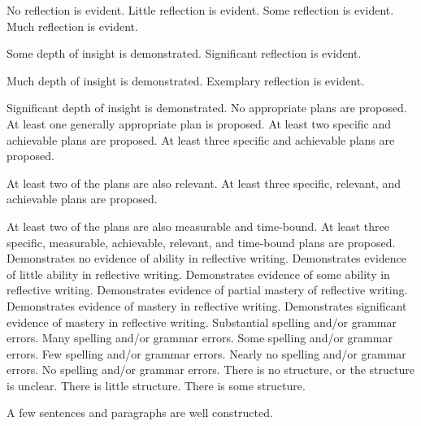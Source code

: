 \documentclass{../fal_assignment}
\begin{document}
\begin{markingrubric}
        \grade\fail 	No reflection is evident.
        \grade 		Little reflection is evident.
        \grade 		Some reflection is evident.
        \grade 		Much reflection is evident.
        \par 		Some depth of insight is demonstrated.
        \grade 		Significant reflection is evident.
        \par 		Much depth of insight is demonstrated.
        \grade 		Exemplary reflection is evident.
        \par 		Significant depth of insight is demonstrated.
%
        \grade\fail 	No appropriate plans are proposed.
        \grade 		At least one generally appropriate plan is proposed.
        \grade 		At least two specific and achievable plans are proposed. 
        \grade 		At least three specific and achievable plans are proposed. 
        \par 		At least two of the plans are also relevant.
        \grade 		At least three specific, relevant, and achievable plans are proposed. 
        \par 		At least two of the plans are also measurable and time-bound.
        \grade 		At least three specific, measurable, achievable, relevant, and time-bound plans are proposed. 
%
        \grade\fail 	Demonstrates no evidence of ability in reflective writing.
        \grade 		Demonstrates evidence of little ability in reflective writing.
        \grade 		Demonstrates evidence of some ability in reflective writing.  
        \grade 		Demonstrates evidence of partial mastery of reflective writing.
        \grade 		Demonstrates evidence of mastery in reflective writing.
        \grade 		Demonstrates significant evidence of mastery in reflective writing.
%
        \grade\fail 	Substantial spelling and/or grammar errors.
        \grade 		Many spelling and/or grammar errors.
        \grade 		Some spelling and/or grammar errors.  
        \grade 		Few spelling and/or grammar errors.
        \grade 		Nearly no spelling and/or grammar errors.
        \grade 		No spelling and/or grammar errors.
%
        \grade\fail 	There is no structure, or the structure is unclear.
        \grade 		There is little structure.
        \grade 		There is some structure.
        \par 		A few sentences and paragraphs are well constructed.

\end{markingrubric}
\end{document}
